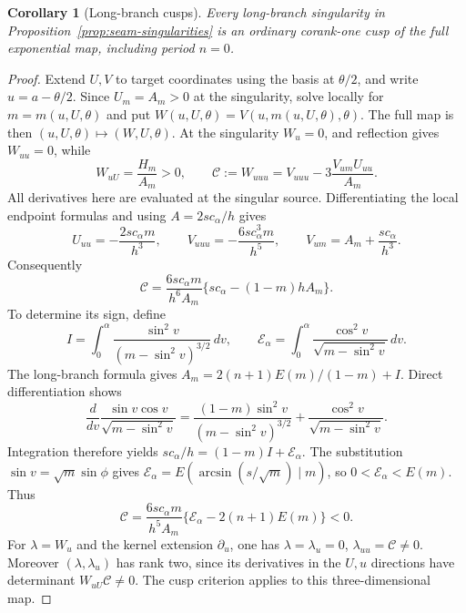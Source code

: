 \documentclass[11pt,a4paper]{article}
\newtheorem{corollary}[theorem]{Corollary}
\theoremstyle{remark}\newtheorem{remark}[theorem]{Remark}
\begin{document}
\begin{corollary}[Long-branch cusps]\label{cor:seam-cusps}
Every long-branch singularity in
Proposition~\ref{prop:seam-singularities} is an ordinary corank-one
cusp of the full exponential map, including period $n=0$.
\end{corollary}
\begin{proof}
Extend $U,V$ to target coordinates using the basis at $\theta/2$,
and write $u=a-\theta/2$. Since $U_m=A_m>0$ at the singularity, solve
locally for $m=m(u,U,\theta)$ and put
$W(u,U,\theta)=V(u,m(u,U,\theta),\theta)$.
The full map is then $(u,U,\theta)\mapsto(W,U,\theta)$.
At the singularity $W_u=0$, and reflection gives $W_{uu}=0$, while
\[
 W_{uU}=\frac{H_m}{A_m}>0,\qquad
 \mathcal C:=W_{uuu}=V_{uuu}-3\frac{V_{um}U_{uu}}{A_m}.
\]
All derivatives here are evaluated at the singular source.
Differentiating the local endpoint formulas and using
$A=2sc_\alpha/h$ gives
\[
 U_{uu}=-\frac{2sc_\alpha m}{h^3},\qquad
 V_{uuu}=-\frac{6sc_\alpha^3m}{h^5},\qquad
 V_{um}=A_m+\frac{sc_\alpha}{h^3}.
\]
Consequently
\begin{equation}\label{eq:seam-cusp-cubic}
 \mathcal C=\frac{6sc_\alpha m}{h^6A_m}
       \{sc_\alpha-(1-m)hA_m\}.
\end{equation}
To determine its sign, define
\[
 I=\int_0^\alpha\frac{\sin^2v}{(m-\sin^2v)^{3/2}}\,dv,
 \qquad
 \mathcal E_\alpha=\int_0^\alpha
       \frac{\cos^2v}{\sqrt{m-\sin^2v}}\,dv.
\]
The long-branch formula gives
$A_m=2(n+1)E(m)/(1-m)+I$. Direct differentiation shows
\[
 \frac{d}{dv}\frac{\sin v\cos v}{\sqrt{m-\sin^2v}}
 =\frac{(1-m)\sin^2v}{(m-\sin^2v)^{3/2}}
       +\frac{\cos^2v}{\sqrt{m-\sin^2v}}.
\]
Integration therefore yields $sc_\alpha/h=(1-m)I+\mathcal E_\alpha$.
The substitution $\sin v=\sqrt m\sin\phi$ gives
$\mathcal E_\alpha=E(\arcsin(s/\sqrt m)\mid m)$, so
$0<\mathcal E_\alpha<E(m)$. Thus
\[
 \mathcal C=\frac{6sc_\alpha m}{h^5A_m}
       \{\mathcal E_\alpha-2(n+1)E(m)\}<0.
\]
For $\lambda=W_u$ and the kernel extension $\partial_u$, one has
$\lambda=\lambda_u=0$, $\lambda_{uu}=\mathcal C\ne0$.
Moreover $(\lambda,\lambda_u)$ has rank two, since its derivatives
in the $U,u$ directions have determinant $W_{uU}\mathcal C\ne0$.
The cusp criterion \cite[Theorem A.1]{SUY} applies to this
three-dimensional map.
\end{proof}
\end{document}
